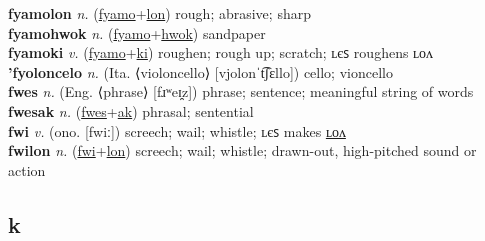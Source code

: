 \textbf{fyamolon} \textit{n.} (\hyperref[fyamo]{fyamo}+\hyperref[lon]{lon})
rough; abrasive; sharp \label{fyamolon} \\
\textbf{fyamohwok} \textit{n.} (\hyperref[fyamo]{fyamo}+\hyperref[hwok]{hwok})
sandpaper \label{fyamohwok} \\
\textbf{fyamoki} \textit{v.} (\hyperref[fyamo]{fyamo}+\hyperref[ki]{ki})
roughen; rough up; scratch; ʟєꜱ roughens ʟᴏᴧ \label{fyamoki} \\
\textbf{'fyoloncelo} \textit{n.} (Ita. ⟨violoncello⟩ [vjolonˈt͡ʃɛllo])
cello; vioncello \label{'fyoloncelo} \\
\textbf{fwes} \textit{n.} (Eng. ⟨phrase⟩ [fɹʷeɪ̯z])
phrase; sentence; meaningful string of words \label{fwes} \\
\textbf{fwesak} \textit{n.} (\hyperref[fwes]{fwes}+\hyperref[ak]{ak})
phrasal; sentential \label{fwesak} \\
\textbf{fwi} \textit{v.} (ono. [fwiː])
screech; wail; whistle; ʟєꜱ makes \hyperref[fwilon]{ʟᴏᴧ} \label{fwi} \\
\textbf{fwilon} \textit{n.} (\hyperref[fwi]{fwi}+\hyperref[lon]{lon})
screech; wail; whistle; drawn-out, high-pitched sound or action \label{fwilon} \\
\subsection{k}

